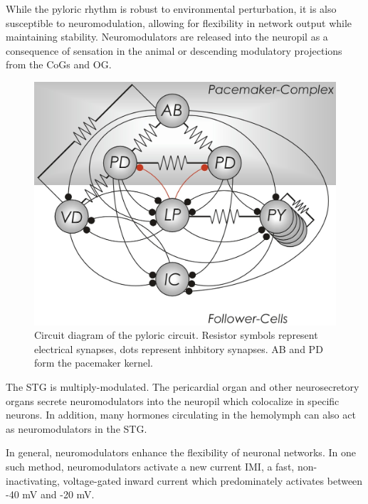 While the pyloric rhythm is robust to environmental perturbation, it is also susceptible to neuromodulation, allowing for flexibility in network output while maintaining stability. Neuromodulators are released into the neuropil as a consequence of sensation in the animal or descending modulatory projections from the \acsp{CoG} and \acs{OG}\autocite{MarderNeuromodulationNeuronalCircuits2012,JohnsonAminemodulationglutamate1997,Nusbaumsmallsystemsapproachmotor2002,MarderCentralpatterngenerators2001,Nusbaumrolescotransmissionneural2001}.

 
\begin{figure}[h]
	\centering
	\includegraphics[width=1\linewidth]{gfx/PyloricCircuit}
	\caption[Circuit diagram of the pyloric circuit]{Circuit diagram of the pyloric circuit. Resistor symbols represent electrical synapses, dots represent inhbitory synapses. \acs{AB} and \acs{PD} form the pacemaker kernel.}
	\label{fig:pyloriccircuit}
\end{figure}

The \acs{STG} is multiply-modulated. The pericardial organ and other neurosecretory organs secrete neuromodulators into the neuropil which colocalize in specific neurons. In addition, many hormones circulating in the hemolymph can also act as neuromodulators in the \acs{STG}\autocite{MarderNeuromodulationNeuronalCircuits2012,NusbaumMichaelP.Functionalconsequencesneuropeptide2017,BlitzDifferentProctolinNeurons1999}.

In general, neuromodulators enhance the flexibility of neuronal networks. In one such method, neuromodulators activate a new current \acs{IMI}, a  fast, non-inactivating, voltage-gated inward current which predominately activates between -40 mV and -20 mV\autocite{GolowaschIoniccurrentslateral1992,GolowaschProctolinactivatesinward1992}.

